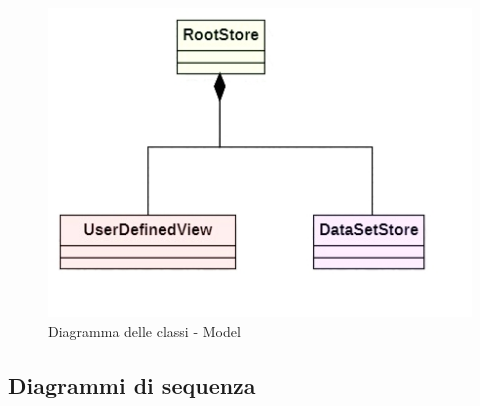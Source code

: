 \begin{figure}[h!]
    \centering
    \includegraphics[scale=0.75]{../../assets/classi_uml/Model.jpg}
    \caption{Diagramma delle classi - Model}
\end{figure}

\subsection{Diagrammi di sequenza}